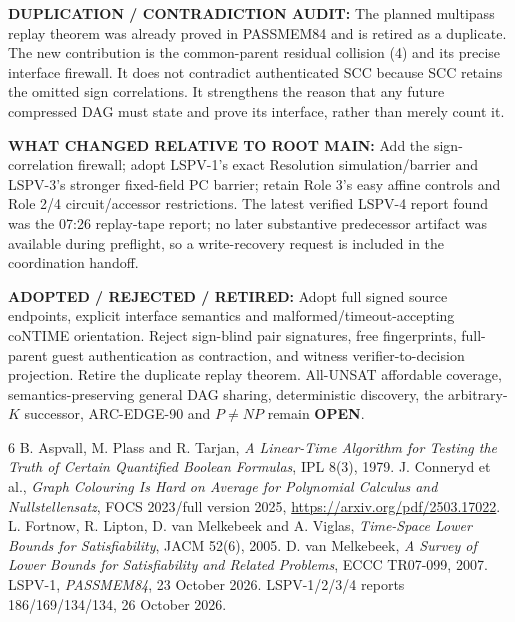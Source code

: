 \documentclass[11pt]{article}
\begin{document}
\noindent\textbf{DUPLICATION / CONTRADICTION AUDIT:} The planned multipass replay theorem
was already proved in PASSMEM84 and is retired as a duplicate.  The new contribution is the
common-parent residual collision (4) and its precise interface firewall.  It does not contradict
authenticated SCC because SCC retains the omitted sign correlations.  It strengthens the reason
that any future compressed DAG must state and prove its interface, rather than merely count it.

\noindent\textbf{WHAT CHANGED RELATIVE TO ROOT MAIN:} Add the sign-correlation firewall;
adopt LSPV-1's exact Resolution simulation/barrier and LSPV-3's stronger fixed-field PC barrier;
retain Role 3's easy affine controls and Role 2/4 circuit/accessor restrictions.  The latest verified
LSPV-4 report found was the 07:26 replay-tape report; no later substantive predecessor artifact was
available during preflight, so a write-recovery request is included in the coordination handoff.

\noindent\textbf{ADOPTED / REJECTED / RETIRED:} Adopt full signed source endpoints, explicit
interface semantics and malformed/timeout-accepting coNTIME orientation.  Reject sign-blind
pair signatures, free fingerprints, full-parent guest authentication as contraction, and witness
verifier-to-decision projection.  Retire the duplicate replay theorem.  All-UNSAT affordable
coverage, semantics-preserving general DAG sharing, deterministic discovery, the arbitrary-$K$
successor, ARC-EDGE-90 and $P\ne NP$ remain \textbf{OPEN}.

\begin{thebibliography}{6}
 B. Aspvall, M. Plass and R. Tarjan, \emph{A Linear-Time Algorithm for Testing the Truth of Certain Quantified Boolean Formulas}, IPL 8(3), 1979.
 J. Conneryd et al., \emph{Graph Colouring Is Hard on Average for Polynomial Calculus and Nullstellensatz}, FOCS 2023/full version 2025, \url{https://arxiv.org/pdf/2503.17022}.
 L. Fortnow, R. Lipton, D. van Melkebeek and A. Viglas, \emph{Time-Space Lower Bounds for Satisfiability}, JACM 52(6), 2005.
 D. van Melkebeek, \emph{A Survey of Lower Bounds for Satisfiability and Related Problems}, ECCC TR07-099, 2007.
 LSPV-1, \emph{PASSMEM84}, 23 October 2026.
 LSPV-1/2/3/4 reports 186/169/134/134, 26 October 2026.
\end{thebibliography}
\end{document}
